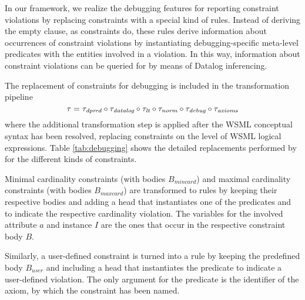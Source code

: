 
In our framework, we realize the debugging features for reporting
constraint violations by replacing constraints with a special kind
of rules. Instead of deriving the empty clause, as constraints do,
these rules derive information about occurrences of constraint
violations by instantiating debugging-specific meta-level
predicates with the entities involved in a violation. In this way,
information about constraint violations can be queried for by
means of Datalog inferencing.

The replacement of constraints for debugging is included in the
transformation pipeline
\begin{displaymath}
    \tau = \tau_{\textit{\scriptsize{dpred}}} \circ \tau_{\textit{\scriptsize{datalog}}} \circ \tau_{\textit{\scriptsize{lt}}} \circ \tau_{\textit{\scriptsize{norm}}} \circ \tau_{\textit{\scriptsize{debug}}} \circ \tau_{\textit{\scriptsize{axioms}}}
\end{displaymath}
where the additional transformation step \transdebug is applied
after the WSML conceptual syntax has been resolved, replacing
constraints on the level of WSML logical expressions. Table
\ref{tab:debugging} shows the detailed replacements performed by
\transdebug for the different kinds of constraints.

Minimal cardinality constraints (with bodies $B_{mincard}$) and
maximal cardinality constraints (with bodies $B_{maxcard}$) are
transformed to rules by keeping their respective bodies and adding
a head that instantiates one of the predicates \pvmincard and
\pvmaxcard to indicate the respective cardinality violation. The
variables for the involved attribute $a$ and instance $I$ are the
ones that occur in the respective constraint body $B$.

Similarly, a user-defined constraint is turned into a rule by
keeping the predefined body $B_{user}$ and including a head that
instantiates the predicate \pvuser to indicate a user-defined
violation. The only argument for the predicate \pvuser is the
identifier \axiomid of the axiom, by which the constraint has been
named.

